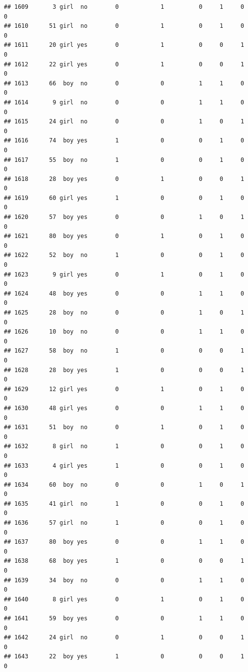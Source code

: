 \documentclass[man]{apa6}
\begin{document}
\begin{verbatim}
## 1609       3 girl  no        0            1          0     1     0     0
## 1610      51 girl  no        0            1          0     1     0     0
## 1611      20 girl yes        0            1          0     0     1     0
## 1612      22 girl yes        0            1          0     0     1     0
## 1613      66  boy  no        0            0          1     1     0     0
## 1614       9 girl  no        0            0          1     1     0     0
## 1615      24 girl  no        0            0          1     0     1     0
## 1616      74  boy yes        1            0          0     1     0     0
## 1617      55  boy  no        1            0          0     1     0     0
## 1618      28  boy yes        0            1          0     0     1     0
## 1619      60 girl yes        1            0          0     1     0     0
## 1620      57  boy yes        0            0          1     0     1     0
## 1621      80  boy yes        0            1          0     1     0     0
## 1622      52  boy  no        1            0          0     1     0     0
## 1623       9 girl yes        0            1          0     1     0     0
## 1624      48  boy yes        0            0          1     1     0     0
## 1625      28  boy  no        0            0          1     0     1     0
## 1626      10  boy  no        0            0          1     1     0     0
## 1627      58  boy  no        1            0          0     0     1     0
## 1628      28  boy yes        1            0          0     0     1     0
## 1629      12 girl yes        0            1          0     1     0     0
## 1630      48 girl yes        0            0          1     1     0     0
## 1631      51  boy  no        0            1          0     1     0     0
## 1632       8 girl  no        1            0          0     1     0     0
## 1633       4 girl yes        1            0          0     1     0     0
## 1634      60  boy  no        0            0          1     0     1     0
## 1635      41 girl  no        1            0          0     1     0     0
## 1636      57 girl  no        1            0          0     1     0     0
## 1637      80  boy yes        0            0          1     1     0     0
## 1638      68  boy yes        1            0          0     0     1     0
## 1639      34  boy  no        0            0          1     1     0     0
## 1640       8 girl yes        0            1          0     1     0     0
## 1641      59  boy yes        0            0          1     1     0     0
## 1642      24 girl  no        0            1          0     0     1     0
## 1643      22  boy yes        1            0          0     0     1     0

\end{verbatim}
\end{document}
